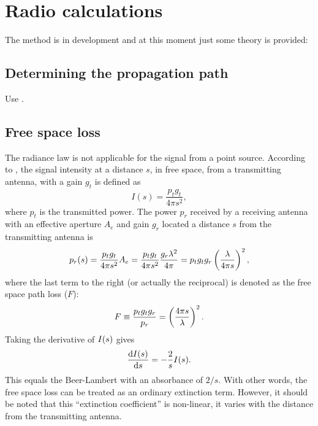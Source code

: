 \section{Radio calculations}
\label{sec:radiolinks}

The  method is in development and at this moment just
some theory is provided:


\subsection{Determining the propagation path}
\label{sec:radiolinks:ppath}

Use .


\subsection{Free space loss}
\label{sec:radiolinks:ppath}
The radiance law is not applicable for the signal from a point source.
According to \citet{ippolito:satco:08}, the signal intensity at a distance
\(s\), in free space, from a transmitting antenna, with a gain \(g_{t}\) is
defined as
\begin{equation}
 I(s)=\frac{p_{t}g_{t}}{4\pi s^{2}},
\end{equation}
where \(p_{t}\) is the transmitted power. The power \(p_{r}\) received by a
receiving antenna with an effective aperture \(A_{e}\) and gain \(g_{r}\)
located a distance \(s\) from the transmitting antenna is
\begin{equation}
\label{eq:fsl}
p_{r}(s)=\frac{p_{t}g_{t}}{4\pi s^{2}}A_{e}=\frac{p_{t}g_{t}}{4\pi s^{2}}
\frac{g_{r}\lambda^{2}}{4\pi}=
p_{t}g_{t}g_{r}\left(\frac{\lambda}{4\pi s} \right)^{2},
\end{equation}
where the last term  
to the right (or actually the reciprocal) is denoted as the
free space path loss (\(F\)):
\begin{equation}
F\equiv\frac{p_{t}g_{t}g_{r}}{p_{r}}=\left(\frac{4\pi s}{\lambda}\right)^{2}.
\end{equation}
Taking the derivative of \(I(s)\) gives
\begin{equation}
\label{eq:fsplarts}
 \frac{\mathrm{d}I(s)}{\mathrm{d} s}=-\frac{2}{s}I(s).
\end{equation}
This equals the Beer-Lambert with an absorbance of $2/s$. With other words, the
free space loss can be treated as an ordinary extinction term. However, it
should be noted that this ``extinction coefficient'' is non-linear, it varies
with the distance from the transmitting antenna. 


